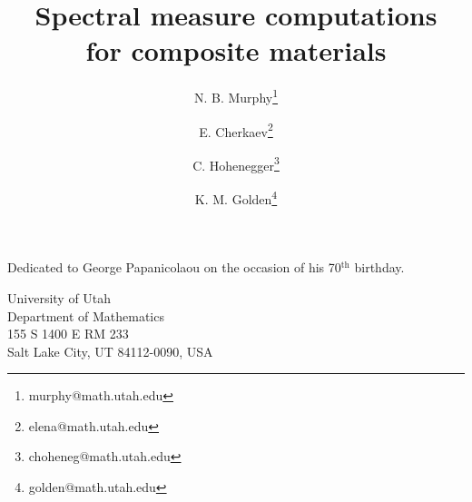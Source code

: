 \documentclass{cmslatex}
\begin{document}
\title{Spectral measure computations \\ for composite materials}
%
\author{N. B. Murphy\thanks {murphy@math.utah.edu}
%
\and E. Cherkaev\thanks {elena@math.utah.edu}
%
\and C. Hohenegger\thanks {choheneg@math.utah.edu}
%
\and K. M. Golden\thanks {golden@math.utah.edu}
}



\pagestyle{myheadings} 
\maketitle

\begin{center}
  Dedicated to George Papanicolaou on the occasion of his 70$^\text{th}$ birthday.
\end{center}

\vspace{2ex}

\begin{center}
University of Utah\\
Department of Mathematics \\ 155 S 1400 E
  RM 233  \\Salt Lake City, UT 84112-0090, USA
\end{center}

\vspace{3ex}
\end{document}
